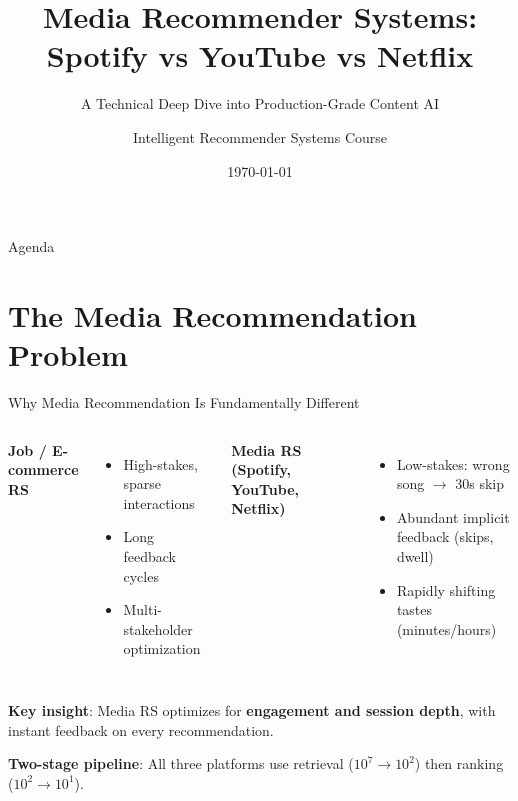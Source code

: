 \documentclass[aspectratio=169, 11pt]{beamer}
\title[Media Recommender Systems]{Media Recommender Systems: \\ Spotify vs YouTube vs Netflix}
\subtitle{A Technical Deep Dive into Production-Grade Content AI}
\author{Intelligent Recommender Systems Course}
\date{\today}
\begin{document}
\begin{frame}
\titlepage
\end{frame}

\begin{frame}{Agenda}
\tableofcontents
\end{frame}

\section{The Media Recommendation Problem}

\begin{frame}{Why Media Recommendation Is Fundamentally Different}
\begin{columns}[T]
\small
\textbf{Job / E-commerce RS}
\begin{itemize}
    \item High-stakes, sparse interactions
    \item Long feedback cycles
    \item Multi-stakeholder optimization
\end{itemize}

\small
\textbf{Media RS (Spotify, YouTube, Netflix)}
\begin{itemize}
    \item Low-stakes: wrong song $\to$ 30s skip
    \item Abundant implicit feedback (skips, dwell)
    \item Rapidly shifting tastes (minutes/hours)
\end{itemize}
\end{columns}

\vspace{0.2cm}
\centering
\small
\textbf{Key insight}: Media RS optimizes for \textbf{engagement and session depth}, with instant feedback on every recommendation.

\vspace{0.1cm}
\small
\textbf{Two-stage pipeline}: All three platforms use retrieval ($10^7\to10^2$) then ranking ($10^2\to10^1$).
\end{frame}
\end{document}
